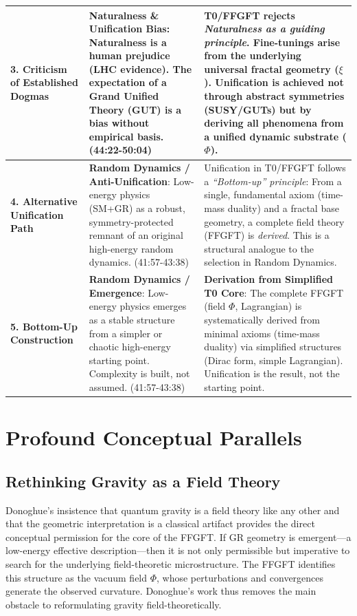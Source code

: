 \begin{longtable}{p{} p{} p{}}
		\textbf{3. Criticism of Established Dogmas} & 
		\textbf{Naturalness \& Unification Bias}: Naturalness is a human prejudice (LHC evidence). The expectation of a Grand Unified Theory (GUT) is a bias without empirical basis. \cite{DonoghueInterview2025} (44:22-50:04) & 
		T0/FFGFT rejects \emph{Naturalness as a guiding principle}. Fine-tunings arise from the underlying universal fractal geometry ($\xi$). Unification is achieved not through abstract symmetries (SUSY/GUTs) but by deriving all phenomena from a unified dynamic substrate ($\Phi$). \\
		\midrule
		
		\textbf{4. Alternative Unification Path} & 
		\textbf{Random Dynamics / Anti-Unification}: Low-energy physics (SM+GR) as a robust, symmetry-protected remnant of an original high-energy random dynamics. \cite{DonoghueInterview2025} (41:57-43:38) & 
		Unification in T0/FFGFT follows a \emph{``Bottom-up'' principle}: From a single, fundamental axiom (time-mass duality) and a fractal base geometry, a complete field theory (FFGFT) is \emph{derived}. This is a structural analogue to the selection in Random Dynamics. \\
		\midrule
		
		\textbf{5. Bottom-Up Construction} & 
		\textbf{Random Dynamics / Emergence}: Low-energy physics emerges as a stable structure from a simpler or chaotic high-energy starting point. Complexity is built, not assumed. \cite{DonoghueInterview2025} (41:57-43:38) & 
		\textbf{Derivation from Simplified T0 Core}: The complete FFGFT (field $\Phi$, Lagrangian) is systematically derived from minimal axioms (time-mass duality) via simplified structures (Dirac form, simple Lagrangian). Unification is the result, not the starting point. \\
		
	\end{longtable}
	
	\section{Profound Conceptual Parallels}
	
	\subsection{Rethinking Gravity as a Field Theory}
	
	Donoghue's insistence that quantum gravity is a field theory like any other and that the geometric interpretation is a classical artifact provides the direct conceptual permission for the core of the FFGFT. If GR geometry is emergent—a low-energy effective description—then it is not only permissible but imperative to search for the underlying field-theoretic microstructure. The FFGFT identifies this structure as the vacuum field $\Phi$, whose perturbations and convergences generate the observed curvature. Donoghue's work thus removes the main obstacle to reformulating gravity field-theoretically.
	
